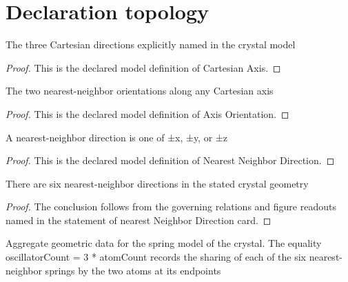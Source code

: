 \section{Declaration topology}
\begin{definition}
  \label{def:physics:phyx-mini-0604:phyxmini0604-cartesianaxis}
  The three Cartesian directions explicitly named in the crystal model
\end{definition}
\begin{proof}
  This is the declared model definition of Cartesian Axis.
\end{proof}
\begin{definition}
  \label{def:physics:phyx-mini-0604:phyxmini0604-axisorientation}
  The two nearest-neighbor orientations along any Cartesian axis
\end{definition}
\begin{proof}
  This is the declared model definition of Axis Orientation.
\end{proof}
\begin{definition}
  \label{def:physics:phyx-mini-0604:phyxmini0604-nearestneighbordirection}
  A nearest-neighbor direction is one of ±x, ±y, or ±z
\end{definition}
\begin{proof}
  This is the declared model definition of Nearest Neighbor Direction.
\end{proof}
\begin{theorem}
  \label{thm:physics:phyx-mini-0604:phyxmini0604-nearestneighbordirection-card}
  There are six nearest-neighbor directions in the stated crystal geometry
\end{theorem}
\begin{proof}
  The conclusion follows from the governing relations and figure readouts named in the statement of nearest Neighbor Direction card.
\end{proof}
\begin{definition}
  \label{def:physics:phyx-mini-0604:phyxmini0604-crystalgeometry}
  Aggregate geometric data for the spring model of the crystal. The equality oscillatorCount = 3 * atomCount records the sharing of each of the six nearest-neighbor springs by the two atoms at its endpoints
\end{definition}
